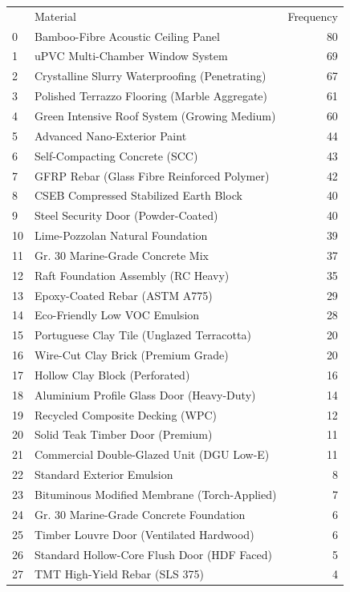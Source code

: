 \begin{tabular}{llr}
 & Material & Frequency \\
0 & Bamboo-Fibre Acoustic Ceiling Panel & 80 \\
1 & uPVC Multi-Chamber Window System & 69 \\
2 & Crystalline Slurry Waterproofing (Penetrating) & 67 \\
3 & Polished Terrazzo Flooring (Marble Aggregate) & 61 \\
4 & Green Intensive Roof System (Growing Medium) & 60 \\
5 & Advanced Nano-Exterior Paint & 44 \\
6 & Self-Compacting Concrete (SCC) & 43 \\
7 & GFRP Rebar (Glass Fibre Reinforced Polymer) & 42 \\
8 & CSEB Compressed Stabilized Earth Block & 40 \\
9 & Steel Security Door (Powder-Coated) & 40 \\
10 & Lime-Pozzolan Natural Foundation & 39 \\
11 & Gr. 30 Marine-Grade Concrete Mix & 37 \\
12 & Raft Foundation Assembly (RC Heavy) & 35 \\
13 & Epoxy-Coated Rebar (ASTM A775) & 29 \\
14 & Eco-Friendly Low VOC Emulsion & 28 \\
15 & Portuguese Clay Tile (Unglazed Terracotta) & 20 \\
16 & Wire-Cut Clay Brick (Premium Grade) & 20 \\
17 & Hollow Clay Block (Perforated) & 16 \\
18 & Aluminium Profile Glass Door (Heavy-Duty) & 14 \\
19 & Recycled Composite Decking (WPC) & 12 \\
20 & Solid Teak Timber Door (Premium) & 11 \\
21 & Commercial Double-Glazed Unit (DGU Low-E) & 11 \\
22 & Standard Exterior Emulsion & 8 \\
23 & Bituminous Modified Membrane (Torch-Applied) & 7 \\
24 & Gr. 30 Marine-Grade Concrete Foundation & 6 \\
25 & Timber Louvre Door (Ventilated Hardwood) & 6 \\
26 & Standard Hollow-Core Flush Door (HDF Faced) & 5 \\
27 & TMT High-Yield Rebar (SLS 375) & 4 \\

\end{tabular}
